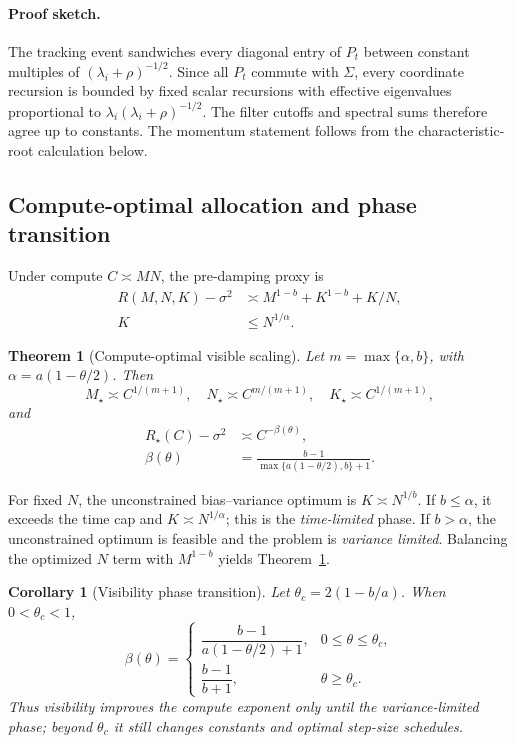 \documentclass[letterpaper]{article} %
\newtheorem{theorem}{Theorem}
\newtheorem{corollary}{Corollary}
\begin{document}
\paragraph{Proof sketch.}
The tracking event sandwiches every diagonal entry of $P_t$ between constant multiples of $(\lambda_i+\rho)^{-1/2}$.  Since all $P_t$ commute with $\Sigma$, every coordinate recursion is bounded by fixed scalar recursions with effective eigenvalues proportional to $\lambda_i(\lambda_i+\rho)^{-1/2}$.  The filter cutoffs and spectral sums therefore agree up to constants.  The momentum statement follows from the characteristic-root calculation below.

\subsection{Compute-optimal allocation and phase transition}

Under compute $C\asymp MN$, the pre-damping proxy is
\[
 \begin{aligned}
 R(M,N,K)-\sigma^2
 &\asymp M^{1-b}+K^{1-b}+K/N,\\
 K&\le N^{1/\alpha}.
 \end{aligned}
\]

\begin{theorem}[Compute-optimal visible scaling]
\label{thm:compute}
Let $m=\max\{\alpha,b\}$, with $\alpha=a(1-\theta/2)$.  Then
\[
 M_\star\asymp C^{1/(m+1)},\quad
 N_\star\asymp C^{m/(m+1)},\quad
 K_\star\asymp C^{1/(m+1)},
\]
and
\begin{equation}
\label{eq:compute-exponent}
 \begin{aligned}
 R_\star(C)-\sigma^2&\asymp C^{-\beta(\theta)},\\
 \beta(\theta)
 &=\frac{b-1}{\max\{a(1-\theta/2),b\}+1}.
 \end{aligned}
\end{equation}
\end{theorem}

For fixed $N$, the unconstrained bias--variance optimum is $K\asymp N^{1/b}$.  If $b\le\alpha$, it exceeds the time cap and $K\asymp N^{1/\alpha}$; this is the \emph{time-limited} phase.  If $b>\alpha$, the unconstrained optimum is feasible and the problem is \emph{variance limited}.  Balancing the optimized $N$ term with $M^{1-b}$ yields Theorem~\ref{thm:compute}.

\begin{corollary}[Visibility phase transition]
\label{cor:visibility-phase}
Let $\theta_c=2(1-b/a)$.  When $0<\theta_c<1$,
\[
 \beta(\theta)=
 \begin{cases}
 \dfrac{b-1}{a(1-\theta/2)+1},
 & 0\le\theta\le\theta_c,\\[6pt]
 \dfrac{b-1}{b+1},
 & \theta\ge\theta_c.
 \end{cases}
\]
Thus visibility improves the compute exponent only until the variance-limited phase; beyond $\theta_c$ it still changes constants and optimal step-size schedules.
\end{corollary}
\end{document}
